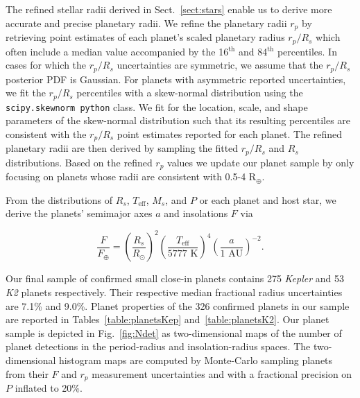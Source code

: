 \documentclass[twocolumn]{emulateapj}
\newcommand{\kepler}[1]{\emph{Kepler}#1}
\newcommand{\ktwo}[1]{\emph{K2}#1}
\newcommand{\teff}[1]{$T_{\text{eff}}$#1}
\begin{document}
The refined stellar radii derived in Sect.~\ref{sect:stars} enable us to derive more accurate and precise
planetary radii.
We refine the planetary radii $r_p$ by retrieving point estimates of each planet's scaled planetary radius
$r_p/R_s$ which often include a median value 
accompanied by the 16$^{\text{th}}$ and 84$^{\text{th}}$ percentiles. In cases for which the $r_p/R_s$ uncertainties
are symmetric, we assume that the $r_p/R_s$ posterior PDF is Gaussian. For planets with asymmetric reported
uncertainties, we fit the $r_p/R_s$ percentiles with a skew-normal distribution using the
\texttt{scipy.skewnorm python} class. We fit for the location, scale, and shape parameters of the
skew-normal distribution such that its resulting percentiles are consistent with
the $r_p/R_s$ point estimates reported for each planet. The refined planetary radii are then derived by sampling the
fitted $r_p/R_s$ and $R_s$ distributions. Based on the refined $r_p$ values we update our planet sample by
only focusing on planets whose radii are consistent with 0.5-4 R$_{\oplus}$.

From the distributions of $R_s$, \teff{,} $M_s$, and $P$ or each planet and host star, we derive the planets'
semimajor axes $a$ and insolations $F$ via

\begin{equation}
  \frac{F}{F_{\oplus}} = \left( \frac{R_s}{R_{\odot}} \right)^2  \left( \frac{T_{\text{eff}}}{5777 \text{ K}} \right)^4 \left( \frac{a}{1 \text{ AU}} \right)^{-2}.
\end{equation}

Our final sample of confirmed small close-in planets 
contains 275 \kepler{} and 53 \ktwo{} planets respectively. Their respective median fractional
radius uncertainties are 7.1\% and 9.0\%. Planet properties of the 326 confirmed planets in our sample
are reported in Tables~\ref{table:planetsKep} and~\ref{table:planetsK2}. Our planet sample is
depicted in Fig.~\ref{fig:Ndet} as two-dimensional maps of the number of planet detections in
the period-radius and insolation-radius spaces. The two-dimensional histogram maps are computed by
Monte-Carlo sampling planets from their $F$ and $r_p$
measurement uncertainties and with a fractional precision on $P$ inflated to 20\%.

\begin{figure*}
  \centering
  \caption{Empirical population of confirmed close-in planets around low mass stars.
    The distribution of 275 and 53 confirmed planets from \kepler{}
    and \ktwo{} respectively as a function of orbital period, insolation, and planet radius. The two-dimensional maps are
    Monte-Carlo sampled from the measurement uncertainties on the planetary radii and insolations while 
    the fractional uncertainties on the orbital periods are inflated to
    20\%.} %
  \label{fig:Ndet}
\end{figure*}
\end{document}
